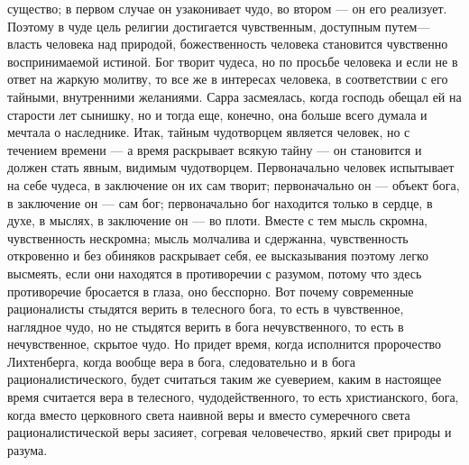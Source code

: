 \documentclass[12pt]{article}
\begin{document}
существо; в первом случае он узаконивает чудо, во втором --- он его реализует. Поэтому в чуде цель религии достигается чувственным, доступным путем--- власть человека над природой, божественность человека становится чувственно воспринимаемой истиной. Бог творит чудеса, но по просьбе человека и если не в ответ на жаркую молитву, то все же в интересах человека, в соответствии с его тайными, внутренними желаниями. Сарра засмеялась, когда господь обещал ей на старости лет сынишку, но и тогда еще, конечно, она больше всего думала и мечтала о наследнике. Итак, тайным чудотворцем является человек, но с течением времени --- а время раскрывает всякую тайну --- он становится и должен стать явным, видимым чудотворцем. Первоначально человек испытывает на себе чудеса, в заключение он их сам творит; первоначально он --- объект бога, в заключение он --- сам бог; первоначально бог находится только в сердце, в духе, в мыслях, в заключение он --- во плоти. Вместе с тем мысль скромна, чувственность нескромна; мысль молчалива и сдержанна, чувственность откровенно и без обиняков раскрывает себя, ее высказывания поэтому легко высмеять, если они находятся в противоречии с разумом, потому что здесь противоречие бросается в глаза, оно бесспорно. Вот почему современные рационалисты стыдятся верить в телесного бога, то есть в чувственное, наглядное чудо, но не стыдятся верить в бога нечувственного, то есть в нечувственное, скрытое чудо. Но придет время, когда исполнится пророчество Лихтенберга, когда вообще вера в бога, следовательно и в бога рационалистического, будет считаться таким же суеверием, каким в настоящее время считается вера в телесного, чудодейственного, то есть христианского, бога, когда вместо церковного света наивной веры и вместо сумеречного света рационалистической веры засияет, согревая человечество, яркий свет природы и разума.


\section{}
\end{document}
